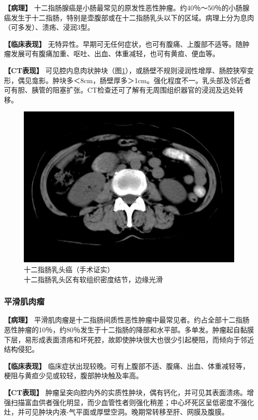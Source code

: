 \textbf{【病理】}
十二指肠腺癌是小肠最常见的原发性恶性肿瘤。约40％～50％的小肠腺癌发生于十二指肠，特别是壶腹部或在十二指肠乳头以下的区域。病理上分为息肉（可多发）、溃疡、浸润3型。

\textbf{【临床表现】}
无特异性。早期可无任何症状，也可有腹痛、上腹部不适等。随肿瘤发展可有腹痛加重、呕吐、出血、体重减轻，也可有黄疸、便血等。

\textbf{【CT表现】}
可见腔内息肉状肿块（图\ref{fig17-11}），或肠壁不规则浸润性增厚、肠腔狭窄变形，偶见龛影。肿块多＜8cm，肠壁厚多＞1cm。强化程度不一。乳头部及邻近者可有胆、胰管的阻塞扩张。CT检查还可了解有无周围组织器官的浸润及远处转移。

\begin{figure}[!htbp]
 \centering
 \includegraphics[width=.7\textwidth,height=\textheight,keepaspectratio]{./images/Image00362.jpg}
 \captionsetup{justification=centering}
 \caption{十二指肠乳头癌（手术证实）\\{\small 十二指肠乳头区有软组织密度结节，边缘光滑}}
 \label{fig17-11}
  \end{figure} 

\subsubsection{平滑肌肉瘤}

\textbf{【病理】}
平滑肌肉瘤是十二指肠间质性恶性肿瘤中最常见者。约占全部十二指肠恶性肿瘤的10％，约80％发生于十二指肠的降部和水平部。多单发。肿瘤起自黏膜下层，易形成表面溃疡和坏死腔，故即使肿块很大也很少引起梗阻，而倾向于邻近结构侵犯。

\textbf{【临床表现】}
临床症状出现较晚。可有上腹部不适、腹痛、出血、体重减轻等，梗阻与黄疸少见或较轻，腹部肿块触及率高。

\textbf{【CT表现】}
肿瘤呈突向腔内外的实质性肿块，偶有钙化，并可见其表面溃疡。增强扫描富血供者强化明显，而少血管性者则强化稍差；中心坏死区呈低密度不强化灶，并可见肿块内液-气平面或厚壁空洞。晚期常转移至肝、网膜及腹膜。

